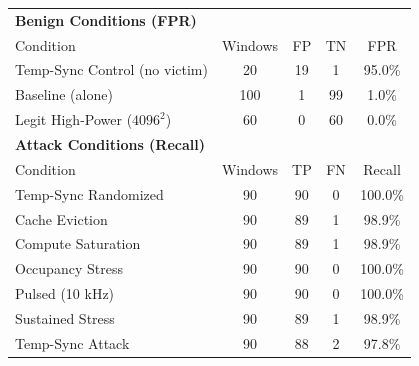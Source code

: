 \begin{tabular}{lcccc}
\toprule
\multicolumn{5}{l}{\textbf{Benign Conditions (FPR)}} \\
Condition & Windows & FP & TN & FPR \\
\midrule
Temp-Sync Control (no victim) & 20 & 19 & 1 & 95.0\% \\
Baseline (alone) & 100 & 1 & 99 & 1.0\% \\
Legit High-Power ($4096^2$) & 60 & 0 & 60 & 0.0\% \\
\midrule
\multicolumn{5}{l}{\textbf{Attack Conditions (Recall)}} \\
Condition & Windows & TP & FN & Recall \\
\midrule
Temp-Sync Randomized & 90 & 90 & 0 & 100.0\% \\
Cache Eviction & 90 & 89 & 1 & 98.9\% \\
Compute Saturation & 90 & 89 & 1 & 98.9\% \\
Occupancy Stress & 90 & 90 & 0 & 100.0\% \\
Pulsed (10 kHz) & 90 & 90 & 0 & 100.0\% \\
Sustained Stress & 90 & 89 & 1 & 98.9\% \\
Temp-Sync Attack & 90 & 88 & 2 & 97.8\% \\
\bottomrule
\end{tabular}
